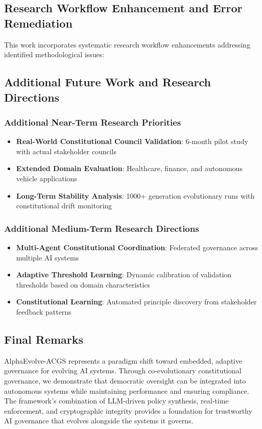 \documentclass[sigconf,natbib]{acmart}
\begin{document}
\subsection{Research Workflow Enhancement and Error Remediation}
\label{subsec:research_workflow_enhancement}
This work incorporates systematic research workflow enhancements addressing identified methodological issues:

\subsection{Additional Future Work and Research Directions}
\label{sec:additional_future_work}

\subsubsection{Additional Near-Term Research Priorities}
\label{subsec:additional_near_term_research}
\begin{itemize}
    \item \textbf{Real-World Constitutional Council Validation}: 6-month pilot study with actual stakeholder councils
    \item \textbf{Extended Domain Evaluation}: Healthcare, finance, and autonomous vehicle applications
    \item \textbf{Long-Term Stability Analysis}: 1000+ generation evolutionary runs with constitutional drift monitoring
\end{itemize}

\subsubsection{Additional Medium-Term Research Directions}
\label{subsec:additional_medium_term_research}
\begin{itemize}
    \item \textbf{Multi-Agent Constitutional Coordination}: Federated governance across multiple AI systems
    \item \textbf{Adaptive Threshold Learning}: Dynamic calibration of validation thresholds based on domain characteristics
    \item \textbf{Constitutional Learning}: Automated principle discovery from stakeholder feedback patterns
\end{itemize}

\subsection{Final Remarks}
\label{sec:final_remarks}
AlphaEvolve-ACGS represents a paradigm shift toward embedded, adaptive governance for evolving AI systems. Through co-evolutionary constitutional governance, we demonstrate that democratic oversight can be integrated into autonomous systems while maintaining performance and ensuring compliance. The framework's combination of LLM-driven policy synthesis, real-time enforcement, and cryptographic integrity provides a foundation for trustworthy AI governance that evolves alongside the systems it governs.
\end{document}
